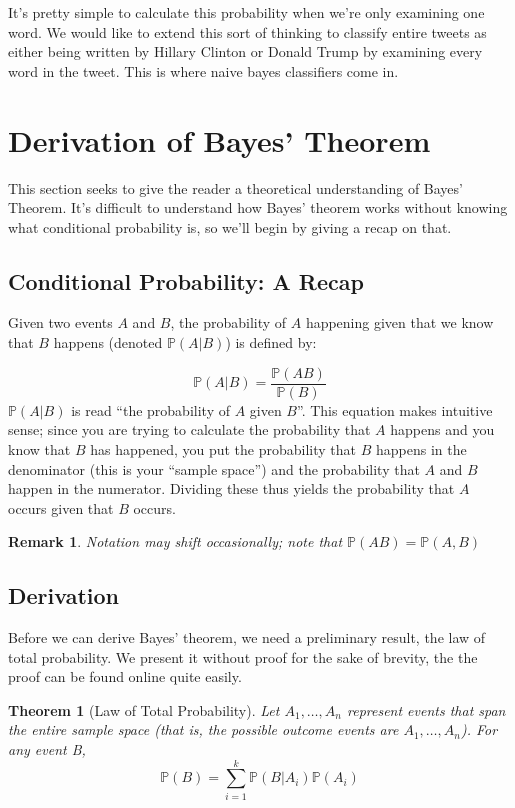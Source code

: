 \documentclass[12pt]{article} \usepackage{amsmath,amssymb,amsthm}
\newtheorem{theorem}{Theorem}[section] \newtheorem*{remark}{Remark}
\begin{document}
It's pretty simple to calculate this probability when we're only examining one
word. We would like to extend this sort of thinking to classify entire tweets as
either being written by Hillary Clinton or Donald Trump by examining every word
in the tweet. This is where naive bayes classifiers come in.

\section{Derivation of Bayes' Theorem}
This section seeks to give the reader a theoretical understanding of Bayes'
Theorem. It's difficult to understand how Bayes' theorem works without knowing
what conditional probability is, so we'll begin by giving a recap on that.

\subsection{Conditional Probability: A Recap}
Given two events $A$ and $B$, the probability of $A$ happening given that we
know that $B$ happens (denoted $\mathbb{P}(A|B)$) is defined by:

$$\mathbb{P}(A|B) = \frac{\mathbb{P}(AB)}{\mathbb{P}(B)}$$
$\mathbb{P}(A|B)$ is read ``the probability of $A$ given $B$''. This equation
makes intuitive sense; since you are trying to calculate the probability that
$A$ happens and you know that $B$ has happened, you put the probability that $B$
happens in the denominator (this is your ``sample space'') and the probability
that $A$ and $B$ happen in the numerator. Dividing these thus yields the
probability that $A$ occurs given that $B$ occurs.

\begin{remark}
Notation may shift occasionally; note that $\mathbb{P}(AB) = \mathbb{P}(A,B)$
\end{remark}

\subsection{Derivation}
Before we can derive Bayes' theorem, we need a preliminary result, the law of
total probability. We present it without proof for the sake of brevity, the the
proof can be found online quite easily.
\begin{theorem}[Law of Total Probability]
  Let $A_1, \dots, A_n$ represent events that span the entire sample space (that
  is, the possible outcome events are $A_1, \dots, A_n$). For any event B, 
  $$\mathbb{P}(B) = \sum \limits_{i=1}^{k} \mathbb{P}(B|A_i)\mathbb{P}(A_i)$$
\end{theorem}
\end{document}
